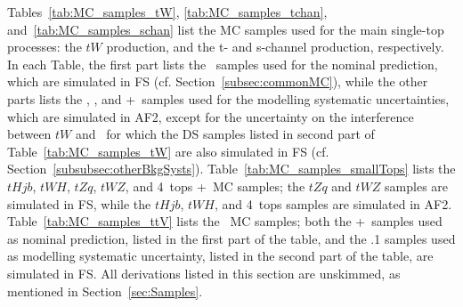 Tables~\ref{tab:MC_samples_tW}, \ref{tab:MC_samples_tchan}, and~\ref{tab:MC_samples_schan} list the MC samples used for the main single-top processes: the $tW$ production, and the t- and s-channel production, respectively.
In each Table, the first part lists the \powhegboxpythia\ samples used for the nominal prediction, which are simulated in FS (cf. Section~\ref{subsec:commonMC}),
while the other parts lists the \powhegboxpythia, \powhegboxherwig, and \mgamc+\pythia\ samples used for the modelling systematic uncertainties, which are simulated in AF2,
except for the uncertainty on the interference between $tW$ and \ttbar\ for which the DS samples listed in second part of Table~\ref{tab:MC_samples_tW} are also simulated in FS (cf. Section~\ref{subsubsec:otherBkgSysts}).
Table~\ref{tab:MC_samples_smallTops} lists the $tHjb$, $tWH$, $tZq$, $tWZ$, and 4~tops \mgamc+\pythia\ MC samples;
the $tZq$ and $tWZ$ samples are simulated in FS, while the $tHjb$, $tWH$, and 4~tops samples are simulated in AF2.
Table~\ref{tab:MC_samples_ttV} lists the \ttV\ MC samples; both the \mgamc+\pythia\ samples used as nominal prediction, listed in the first part of the table, and the .1 samples used as modelling systematic uncertainty,
listed in the second part of the table, are simulated in FS.
All derivations listed in this section are unskimmed, as mentioned in Section~\ref{sec:Samples}.

